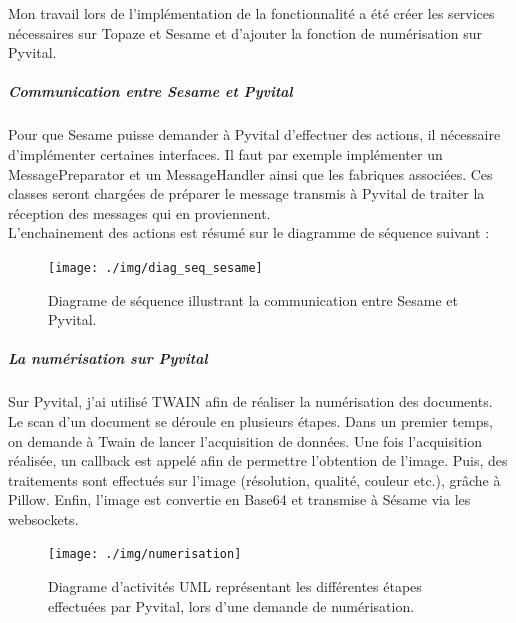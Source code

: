Mon travail lors de l'implémentation de la fonctionnalité a été créer les services nécessaires sur Topaze et Sesame et d'ajouter la fonction de numérisation sur Pyvital.

\subparagraph*{Communication entre Sesame et Pyvital}
Pour que Sesame puisse demander à Pyvital d'effectuer des actions, il nécessaire d'implémenter certaines interfaces. Il faut par exemple implémenter un MessagePreparator et un MessageHandler ainsi que les fabriques associées. Ces classes seront chargées de préparer le message transmis à Pyvital de traiter la réception des messages qui en proviennent. \\
L'enchainement des actions est résumé sur le diagramme de séquence suivant :

\begin{figure}[H]
  \centering
  \vspace{-5pt}
  \texttt{[image: ./img/diag\_seq\_sesame]}
  \caption{\label{fig:diag_seq_sesame} Diagrame de séquence illustrant la communication entre Sesame et Pyvital.}
\end{figure}

\subparagraph*{La numérisation sur Pyvital}
Sur Pyvital, j'ai utilisé TWAIN afin de réaliser la numérisation des documents. Le scan d'un document se déroule en plusieurs étapes. Dans un premier temps, on demande à Twain de lancer l'acquisition de données. Une fois l'acquisition réalisée, un callback est appelé afin de permettre l'obtention de l'image. Puis, des traitements sont effectués sur l'image (résolution, qualité, couleur etc.), grâche à Pillow. Enfin, l'image est convertie en Base64 et transmise à Sésame via les websockets.
 
\begin{figure}[H]
  \centering
  \vspace{-10pt}
  \texttt{[image: ./img/numerisation]}
  \caption{\label{fig:diag_seq_sesame} Diagrame d'activités UML représentant les différentes étapes effectuées par Pyvital, lors d'une demande de numérisation.}
\end{figure}


		

